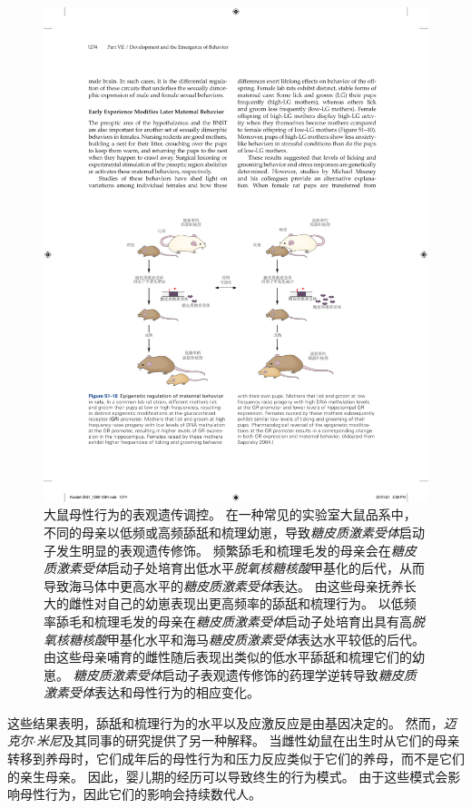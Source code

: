 \begin{figure}[htbp]
	\centering
	\includegraphics[width=0.97\linewidth]{chap51/fig_51_10}
	\caption{大鼠母性行为的表观遗传调控。
		在一种常见的实验室大鼠品系中，不同的母亲以低频或高频舔舐和梳理幼崽，导致\textit{糖皮质激素受体}启动子发生明显的表观遗传修饰。
		频繁舔毛和梳理毛发的母亲会在\textit{糖皮质激素受体}启动子处培育出低水平\textit{脱氧核糖核酸}甲基化的后代，从而导致海马体中更高水平的\textit{糖皮质激素受体}表达。
		由这些母亲抚养长大的雌性对自己的幼崽表现出更高频率的舔舐和梳理行为。
		以低频率舔毛和梳理毛发的母亲在\textit{糖皮质激素受体}启动子处培育出具有高\textit{脱氧核糖核酸}甲基化水平和海马\textit{糖皮质激素受体}表达水平较低的后代。
		由这些母亲哺育的雌性随后表现出类似的低水平舔舐和梳理它们的幼崽。
		\textit{糖皮质激素受体}启动子表观遗传修饰的药理学逆转导致\textit{糖皮质激素受体}表达和母性行为的相应变化\cite{sapolsky2004mothering}。}
	\label{fig:51_10}
\end{figure}


这些结果表明，舔舐和梳理行为的水平以及应激反应是由基因决定的。
然而，\textit{迈克尔$\cdot$米尼}及其同事的研究提供了另一种解释。
当雌性幼鼠在出生时从它们的母亲转移到养母时，它们成年后的母性行为和压力反应类似于它们的养母，而不是它们的亲生母亲。
因此，婴儿期的经历可以导致终生的行为模式。
由于这些模式会影响母性行为，因此它们的影响会持续数代人。


